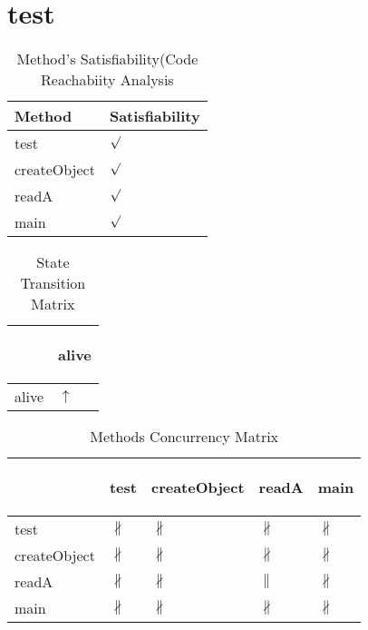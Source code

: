 \documentclass[10pt]{article}
\begin{document}
\section{{\color{Fuchsia}test}}
\label{test}
\begin{longtable}{|l|l|}
\caption{Method's Satisfiability(Code Reachabiity Analysis}\\
\hline
Method & Satisfiability\\
\hline
test&{\color{blue}$\surd$}\\
\hline
createObject&{\color{blue}$\surd$}\\
\hline
readA&{\color{blue}$\surd$}\\
\hline
main&{\color{blue}$\surd$}\\
\hline
\end{longtable}
\begin{longtable}{|l|l|}
\caption{State Transition Matrix}\\
\hline
&\begin{sideways}alive\end{sideways}\\
\hline
alive&{\color{blue}$\uparrow$}\\
\hline
\end{longtable}
\begin{longtable}{|l|l|l|l|l|}
\caption{Methods Concurrency Matrix}\\
\hline
&\begin{sideways}test\end{sideways}&\begin{sideways}createObject\end{sideways}&\begin{sideways}readA\end{sideways}&\begin{sideways}main\end{sideways}\\
\hline
test&{\color{BrickRed}$\nparallel$}&{\color{BrickRed}$\nparallel$}&{\color{BrickRed}$\nparallel$}&{\color{BrickRed}$\nparallel$}\\
\hline
createObject&{\color{BrickRed}$\nparallel$}&{\color{BrickRed}$\nparallel$}&{\color{BrickRed}$\nparallel$}&{\color{BrickRed}$\nparallel$}\\
\hline
readA&{\color{BrickRed}$\nparallel$}&{\color{BrickRed}$\nparallel$}&{\color{blue}$\parallel$}&{\color{BrickRed}$\nparallel$}\\
\hline
main&{\color{BrickRed}$\nparallel$}&{\color{BrickRed}$\nparallel$}&{\color{BrickRed}$\nparallel$}&{\color{BrickRed}$\nparallel$}\\
\hline
\end{longtable}
\newpage
\end{document}
